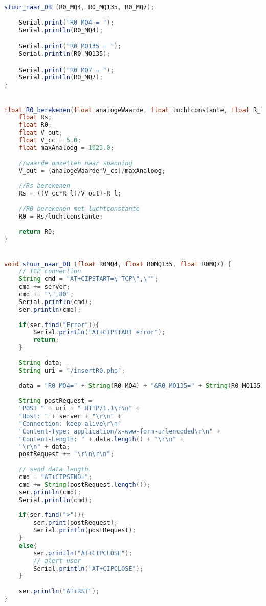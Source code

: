 \begin{lstlisting}[language=Java,caption={Berekenen en verzenden van de R0 waardes}]
    stuur_naar_DB (R0_MQ4, R0_MQ135, R0_MQ7);
    
    Serial.print("R0 MQ4 = ");
    Serial.println(R0_MQ4);

    Serial.print("R0 MQ135 = ");
    Serial.println(R0_MQ135);

    Serial.print("R0 MQ7 = ");
    Serial.println(R0_MQ7);
}


float R0_berekenen(float analogeWaarde, float luchtconstante, float R_l) {
    float Rs;
    float R0;
    float V_out;
    float V_cc = 5.0;
    float maxAnaloog = 1023.0;
    
    //waarde omzetten naar spanning
    V_out = (analogeWaarde*V_cc)/maxAnaloog;
    
    //Rs berekenen
    Rs = ((V_cc*R_l)/V_out)-R_l;
    
    //R0 berekenen met luchtconstante
    R0 = Rs/luchtconstante;
    
    return R0;
}


void stuur_naar_DB (float R0MQ4, float R0MQ135, float R0MQ7) {
    // TCP connection
    String cmd = "AT+CIPSTART=\"TCP\",\"";
    cmd += server;
    cmd += "\",80";
    Serial.println(cmd);
    ser.println(cmd);
    
    if(ser.find("Error")){
        Serial.println("AT+CIPSTART error");
        return;
    }
    
    String data;
    String uri = "/insertR0.php";
    
    data = "R0_MQ4=" + String(R0_MQ4) + "&R0_MQ135=" + String(R0_MQ135) + "&R0_MQ7=" + String(R0_MQ7);
    
    String postRequest =
    "POST " + uri + " HTTP/1.1\r\n" +
    "Host: " + server + "\r\n" +
    "Connection: keep-alive\r\n"
    "Content-Type: application/x-www-form-urlencoded\r\n" +
    "Content-Length: " + data.length() + "\r\n" +
    "\r\n" + data;
    postRequest += "\r\n\r\n";
    
    // send data length
    cmd = "AT+CIPSEND=";
    cmd += String(postRequest.length());
    ser.println(cmd);
    Serial.println(cmd);
    
    if(ser.find(">")){
        ser.print(postRequest);
        Serial.println(postRequest);
    }
    else{
        ser.println("AT+CIPCLOSE");
        // alert user
        Serial.println("AT+CIPCLOSE");
    }
    
    ser.println("AT+RST");
}
   
\end{lstlisting}

